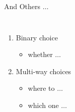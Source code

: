 \begin{frame}{}
  \centerline{\huge And Others $\dots$}
\end{frame}

\begin{frame}{}
  \centerline{}

  \vspace{0.50cm}
  \begin{columns}
      \begin{enumerate}[(1)]
	\item Binary choice
	  \begin{itemize}
	    \item whether $\dots$
	  \end{itemize}
	\item Multi-way choices
	  \begin{itemize}
	    \item where to $\dots$ 
	    \item which one $\dots$
	  \end{itemize}
      \end{enumerate}
  \end{columns}
\end{frame}
